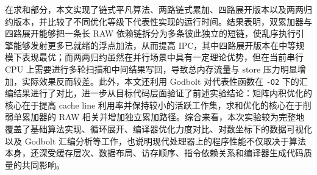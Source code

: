 \documentclass[a4paper,10pt]{article}
\begin{document}
在求和部分，本文实现了链式平凡算法、两路链式累加、四路展开版本以及两两归约版本，并比较了不同优化等级下代表性实现的运行时间。结果表明，双累加器与四路展开能够把一条长 RAW 依赖链拆分为多条彼此独立的短链，使乱序执行引擎能够发射更多已就绪的浮点加法，从而提高 IPC，其中四路展开版本在中等规模下表现最优；而两两归约虽然在并行场景中具有一定理论优势，但在当前串行 CPU 上需要进行多轮扫描和中间结果写回，导致总内存流量与 store 压力明显增加，实际效果反而较差。此外，本文还利用 Godbolt 对代表性函数在 \texttt{-O2} 下的汇编结果进行了对比，进一步从目标代码层面验证了前述实验结论：矩阵内积优化的核心在于提高 cache line 利用率并保持较小的活跃工作集，求和优化的核心在于削弱单累加器的 RAW 相关并增加独立累加路径。综合来看，本次实验较为完整地覆盖了基础算法实现、循环展开、编译器优化力度对比、对数坐标下的数据可视化以及 Godbolt 汇编分析等工作，也说明现代处理器上的程序性能不仅取决于算法本身，还深受缓存层次、数据布局、访存顺序、指令依赖关系和编译器生成代码质量的共同影响。
\end{document}
